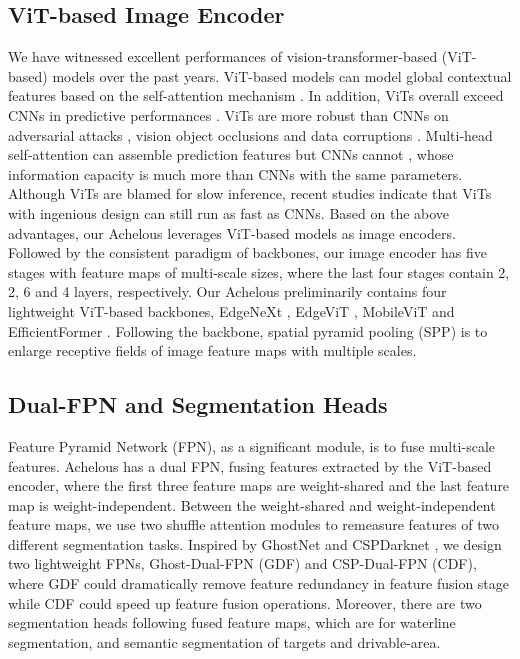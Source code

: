 \documentclass[letterpaper, 10 pt, conference]{ieeeconf}
\begin{document}
\subsection{ViT-based Image Encoder}
We have witnessed excellent performances of vision-transformer-based (ViT-based) models over the past years. ViT-based models can model global contextual features based on the self-attention mechanism \cite{dosovitskiyimage}. In addition, ViTs overall exceed CNNs in predictive performances \cite{liu2021swin}\cite{liu2022swin}\cite{baobeit}. ViTs are more robust than CNNs on adversarial attacks \cite{Shao_Shi_Yi_Chen_Hsieh_2021}\cite{Bhojanapalli_Chakrabarti_Glasner_Li_Unterthiner_Veit_2021}\cite{Paul_Chen_2022}, vision object occlusions \cite{Naseer_Ranasinghe_Khan_Hayat_Khan_Yang_2021} and data corruptions \cite{minderer2021revisiting}. Multi-head self-attention can assemble prediction features but CNNs cannot \cite{park2022blurs}, whose information capacity is much more than CNNs with the same parameters. Although ViTs are blamed for slow inference, recent studies \cite{pan2022edgevits}\cite{maaz2023edgenext}\cite{mehta2021mobilevit}\cite{li2022efficientformer} indicate that ViTs with ingenious design can still run as fast as CNNs. Based on the above advantages, our Achelous leverages ViT-based models as image encoders. Followed by the consistent paradigm of backbones, our image encoder has five stages with feature maps of multi-scale sizes, where the last four stages contain 2, 2, 6 and 4 layers, respectively. Our Achelous preliminarily contains four lightweight ViT-based backbones, EdgeNeXt \cite{maaz2023edgenext}, EdgeViT \cite{pan2022edgevits}, MobileViT \cite{mehta2021mobilevit} and EfficientFormer \cite{li2022efficientformer}. Following the backbone, spatial pyramid pooling (SPP) \cite{he2015spatial} is to enlarge receptive fields of image feature maps with multiple scales. 

\subsection{Dual-FPN and Segmentation Heads}
Feature Pyramid Network (FPN), as a significant module, is to fuse multi-scale features. Achelous has a dual FPN, fusing features extracted by the ViT-based encoder, where the first three feature maps are weight-shared and the last feature map is weight-independent. Between the weight-shared and weight-independent feature maps, we use two shuffle attention \cite{Zhang_Yang_2021} modules to remeasure features of two different segmentation tasks. Inspired by GhostNet \cite{Han_Wang_Tian_Guo_Xu_Xu_2020} and CSPDarknet \cite{Bochkovskiy_Wang_Liao_2020}, we design two lightweight FPNs, Ghost-Dual-FPN (GDF) and CSP-Dual-FPN (CDF), where GDF could dramatically remove feature redundancy in feature fusion stage while CDF could speed up feature fusion operations. Moreover, there are two segmentation heads following fused feature maps, which are for waterline segmentation, and semantic segmentation of targets and drivable-area. 
\end{document}
